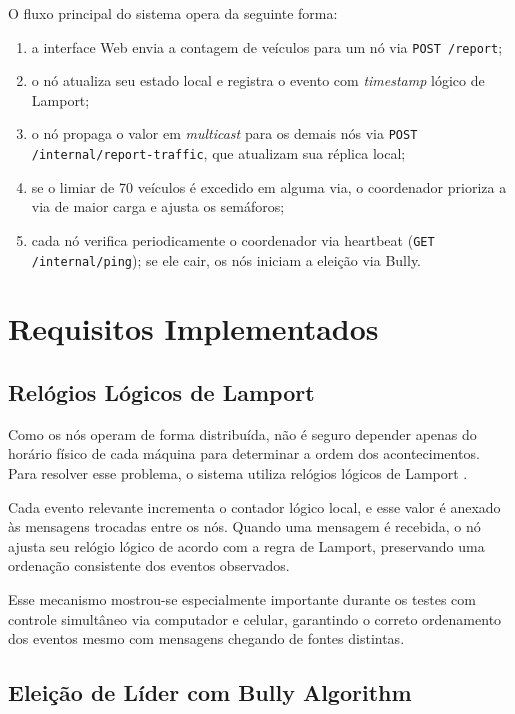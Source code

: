 \documentclass[12pt]{article}
\begin{document}
O fluxo principal do sistema opera da seguinte forma:
\begin{enumerate}
    \item a interface Web envia a contagem de veículos para um nó via \texttt{POST /report};
    \item o nó atualiza seu estado local e registra o evento com \textit{timestamp} lógico de Lamport;
    \item o nó propaga o valor em \textit{multicast} para os demais nós via \texttt{POST /internal/report-traffic}, que atualizam sua réplica local;
    \item se o limiar de 70 veículos é excedido em alguma via, o coordenador prioriza a via de maior carga e ajusta os semáforos;
    \item cada nó verifica periodicamente o coordenador via heartbeat (\texttt{GET /internal/ping}); se ele cair, os nós iniciam a eleição via Bully.
\end{enumerate}

\section{Requisitos Implementados}

\subsection{Relógios Lógicos de Lamport}

Como os nós operam de forma distribuída, não é seguro depender apenas do horário físico de cada máquina para determinar a ordem dos acontecimentos. Para resolver esse problema, o sistema utiliza relógios lógicos de Lamport \cite{lamport}.

Cada evento relevante incrementa o contador lógico local, e esse valor é anexado às mensagens trocadas entre os nós. Quando uma mensagem é recebida, o nó ajusta seu relógio lógico de acordo com a regra de Lamport, preservando uma ordenação consistente dos eventos observados.

Esse mecanismo mostrou-se especialmente importante durante os testes com controle simultâneo via computador e celular, garantindo o correto ordenamento dos eventos mesmo com mensagens chegando de fontes distintas.

\subsection{Eleição de Líder com Bully Algorithm}
\end{document}
